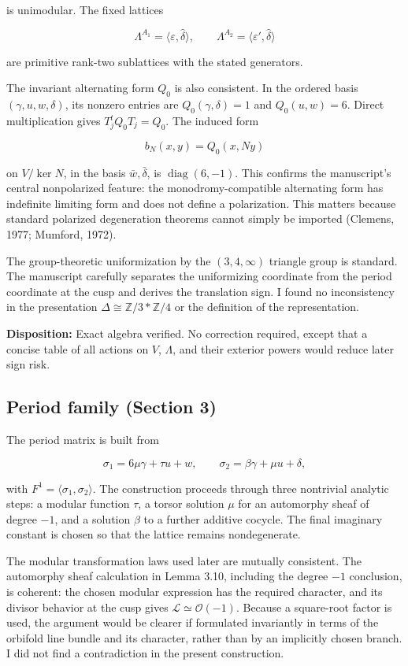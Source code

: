 \documentclass[
  10pt,
  letterpaper,
]{article}
\newcommand{\Z}{\mathbb Z}
\newcommand{\cO}{\mathcal O}
\begin{document}
is unimodular. The fixed lattices

\[
\Lambda^{A_1}=\langle\varepsilon,\widehat\delta\rangle,
\qquad
\Lambda^{A_2}=\langle\varepsilon',\widehat\delta\rangle
\]

are primitive rank-two sublattices with the stated generators.

The invariant alternating form \(Q_0\) is also consistent. In the
ordered basis \((\gamma,u,w,\delta)\), its nonzero entries are
\(Q_0(\gamma,\delta)=1\) and \(Q_0(u,w)=6\). Direct multiplication gives
\(T_j^tQ_0T_j=Q_0\). The induced form

\[
b_N(x,y)=Q_0(x,Ny)
\]

on \(V/\ker N\), in the basis \(\bar w,\bar\delta\), is
\(\operatorname{diag}(6,-1)\). This confirms the manuscript's central
nonpolarized feature: the monodromy-compatible alternating form has
indefinite limiting form and does not define a polarization. This
matters because standard polarized degeneration theorems cannot simply
be imported (Clemens, 1977; Mumford, 1972).

The group-theoretic uniformization by the \((3,4,\infty)\) triangle
group is standard. The manuscript carefully separates the uniformizing
coordinate from the period coordinate at the cusp and derives the
translation sign. I found no inconsistency in the presentation
\(\Delta\cong\Z/3*\Z/4\) or the definition of the representation.

\textbf{Disposition:} Exact algebra verified. No correction required,
except that a concise table of all actions on \(V\), \(\Lambda\), and
their exterior powers would reduce later sign risk.

\subsection{Period family (Section 3)}\label{period-family-section-3}

The period matrix is built from

\[
\sigma_1=6\mu\gamma+\tau u+w,
\qquad
\sigma_2=\beta\gamma+\mu u+\delta,
\]

with \(F^1=\langle\sigma_1,\sigma_2\rangle\). The construction proceeds
through three nontrivial analytic steps: a modular function \(\tau\), a
torsor solution \(\mu\) for an automorphy sheaf of degree \(-1\), and a
solution \(\beta\) to a further additive cocycle. The final imaginary
constant is chosen so that the lattice remains nondegenerate.

The modular transformation laws used later are mutually consistent. The
automorphy sheaf calculation in Lemma 3.10, including the degree \(-1\)
conclusion, is coherent: the chosen modular expression has the required
character, and its divisor behavior at the cusp gives
\(\mathscr L\simeq\cO(-1)\). Because a square-root factor is used, the
argument would be clearer if formulated invariantly in terms of the
orbifold line bundle and its character, rather than by an implicitly
chosen branch. I did not find a contradiction in the present
construction.
\end{document}
